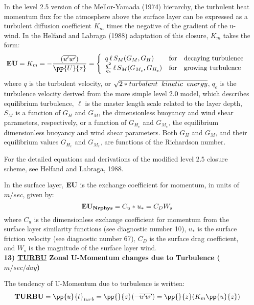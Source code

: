 \noindent  
In the level 2.5 version of the Mellor-Yamada (1974) hierarchy, the turbulent heat
momentum flux for the atmosphere above the surface layer can be expressed as a turbulent
diffusion coefficient $K_m$ times the negative of the gradient of the u-wind.
In the Helfand and Labraga (1988) adaptation of this closure, $K_m$
takes the form:
\[
{\bf EU} = K_m = -{( {\overline{u^{\prime}w^{\prime}}}) \over {\pp{U}{z}} }
 = \left\{ \begin{array}{l@{\quad\mbox{for}\quad}l} q \, \ell \, S_M(G_M,G_H) & \mbox{decaying turbulence}
\\ { q^2 \over {q_e} } \, \ell \, S_{M}(G_{M_e},G_{H_e}) & \mbox{growing turbulence} \end{array} \right.
\]
\noindent
where $q$ is the turbulent velocity, or $\sqrt{2*turbulent \hspace{.2cm} kinetic \hspace{.2cm}
energy}$, $q_e$ is the turbulence velocity derived from the more simple level 2.0 model,
which describes equilibrium turbulence, $\ell$ is the master length scale related to the layer
depth, 
$S_M$ is a function of $G_H$ and $G_M$, the dimensionless buoyancy and
wind shear parameters, respectively, or a function of $G_{H_e}$ and $G_{M_e}$, the equilibrium 
dimensionless buoyancy and wind shear
parameters.   Both $G_H$ and $G_M$, and their equilibrium values $G_{H_e}$ and $G_{M_e}$, 
are functions of the Richardson number.

\noindent
For the detailed equations and derivations of the modified level 2.5 closure scheme,
see Helfand and Labraga, 1988.
 
\noindent
In the surface layer, ${\bf {EU}}$ is the exchange coefficient for momentum,
in units of $m/sec$, given by:
\[
{\bf EU_{Nrphys}} = C_u * u_* = C_D W_s
\]
\noindent
where $C_u$ is the dimensionless exchange coefficient for momentum from the surface layer 
similarity functions (see diagnostic number 10), $u_*$ is the surface friction velocity 
(see diagnostic number 67), $C_D$ is the surface drag coefficient, and $W_s$ is the 
magnitude of the surface layer wind.
\\
 
\noindent
{\bf 13)  \underline {TURBU}  Zonal U-Momentum changes due to Turbulence ($m/sec/day$) }
 
\noindent
The tendency of U-Momentum due to turbulence is written:
\[
{\bf TURBU} = {\pp{u}{t}}_{turb} = {\pp{}{z} }{(- \overline{u^{\prime}w^{\prime}})}
 = {\pp{}{z} }{(K_m \pp{u}{z})}
\]

